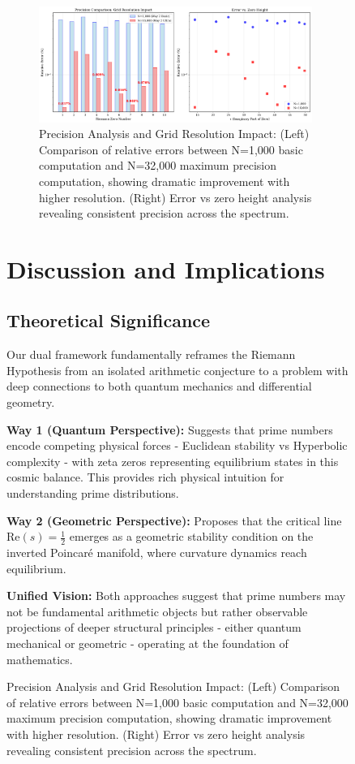 \documentclass[12pt]{article}
\begin{document}
\begin{figure}[ht]
\begin{figure}[ht]
\centering
\includegraphics[width=0.98\textwidth]{precision_comparison.png}
\caption{Precision Analysis and Grid Resolution Impact: (Left) Comparison of relative errors between N=1,000 basic computation and N=32,000 maximum precision computation, showing dramatic improvement with higher resolution. (Right) Error vs zero height analysis revealing consistent precision across the spectrum.}
\label{fig:precision_comparison}
\end{figure}

\section{Discussion and Implications}

\subsection{Theoretical Significance}

Our dual framework fundamentally reframes the Riemann Hypothesis from an isolated arithmetic conjecture to a problem with deep connections to both quantum mechanics and differential geometry.

\textbf{Way 1 (Quantum Perspective):} Suggests that prime numbers encode competing physical forces - Euclidean stability vs Hyperbolic complexity - with zeta zeros representing equilibrium states in this cosmic balance. This provides rich physical intuition for understanding prime distributions.

\textbf{Way 2 (Geometric Perspective):} Proposes that the critical line $\text{Re}(s) = \frac{1}{2}$ emerges as a geometric stability condition on the inverted Poincaré manifold, where curvature dynamics reach equilibrium.

\textbf{Unified Vision:} Both approaches suggest that prime numbers may not be fundamental arithmetic objects but rather observable projections of deeper structural principles - either quantum mechanical or geometric - operating at the foundation of mathematics.


\end{figure}
\end{document}
